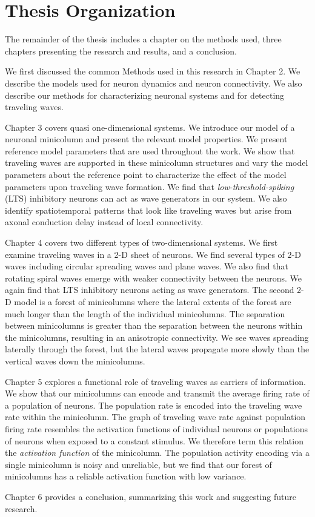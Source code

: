 \section{Thesis Organization}
The remainder of the thesis includes a chapter on the methods used, three chapters presenting the research and results, and a conclusion.

We first discussed the common Methods used in this research in Chapter 2.
We describe the models used for neuron dynamics and neuron connectivity.
We also describe our methods for characterizing neuronal systems and for detecting traveling waves.

Chapter 3 covers quasi one-dimensional systems. 
We introduce our model of a neuronal minicolumn and present the relevant model properties.
We present reference model parameters  that are used throughout the work.
We show that traveling waves are supported in these minicolumn structures and vary the model parameters about the reference point 
to characterize the effect of the model parameters upon traveling wave formation.
We find that \textit{low-threshold-spiking} (LTS) inhibitory neurons can act as wave generators in our system.
We also identify spatiotemporal patterns that look like traveling waves but arise from axonal conduction delay instead of local connectivity.

Chapter 4 covers two different types of two-dimensional systems.
We first examine traveling waves in a 2-D sheet of neurons.
We find several types of 2-D waves including circular spreading waves and plane waves.
We also find that rotating spiral waves emerge with weaker connectivity between the neurons.
We again find that LTS inhibitory neurons acting as wave generators.
The second 2-D model is a forest of minicolumns where the lateral extents of the forest are much longer than the length of the individual minicolumns.
The separation between minicolumns is greater than the separation between the neurons within the minicolumns,
resulting in an anisotropic connectivity.
We see waves spreading laterally through the forest, but the lateral waves propagate more slowly than the vertical waves down the minicolumns.

Chapter 5 explores a functional role of traveling waves as carriers of information.
We show that our minicolumns can encode and transmit the average firing rate of a population of neurons.
The population rate is encoded into the traveling wave rate within the minicolumn.
The graph of traveling wave rate against population firing rate resembles the activation functions of individual neurons or 
populations of neurons when exposed to a constant stimulus.
We therefore term this relation the \textit{activation function} of the minicolumn.
The population activity encoding via a single minicolumn is noisy and unreliable,
but we find that our forest of minicolumns has a reliable activation function with low variance.

Chapter 6 provides a conclusion, summarizing this work and suggesting future research.


\endinput
